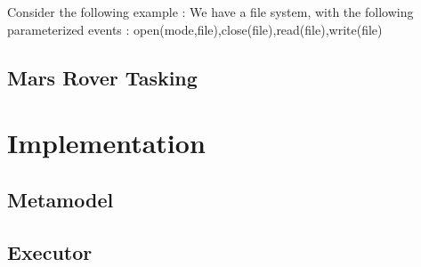 	Consider the following example : We have a file system, with the following parameterized events : open(mode,file),close(file),read(file),write(file)
	\subsection{Mars Rover Tasking}

\section{Implementation}
	\subsection{Metamodel}
	\subsection{Executor}
